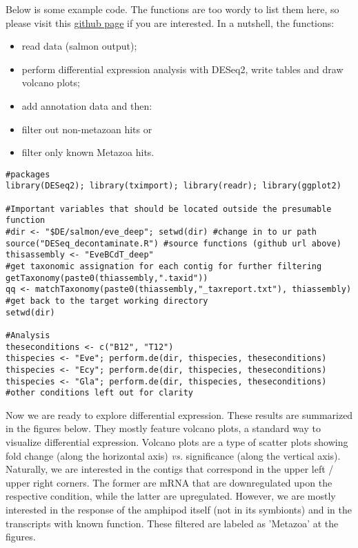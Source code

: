 \documentclass[12pt]{article}
\begin{document}
Below is some example code. 
The functions are too wordy to list them here, so please visit this \href{https://github.com/drozdovapb/code_chunks/blob/master/RNA_seq_DE/DESeq_decontaminate.R}{github page} if you are interested. In a nutshell, the functions: 
\begin{itemize}
\item read data (salmon output);
\item perform differential expression analysis with DESeq2, write tables and draw volcano plots;
\item add annotation data and then: 
\item filter out non-metazoan hits or
\item filter only known Metazoa hits.
\end{itemize}  

\small{
\begin{verbatim}
#packages
library(DESeq2); library(tximport); library(readr); library(ggplot2)

#Important variables that should be located outside the presumable function
#dir <- "$DE/salmon/eve_deep"; setwd(dir) #change in to ur path
source("DESeq_decontaminate.R") #source functions (github url above)
thisassembly <- "EveBCdT_deep"
#get taxonomic assignation for each contig for further filtering
getTaxonomy(paste0(thiassembly,".taxid"))
qq <- matchTaxonomy(paste0(thiassembly,"_taxreport.txt"), thiassembly)
#get back to the target working directory
setwd(dir)

#Analysis
theseconditions <- c("B12", "T12")
thispecies <- "Eve"; perform.de(dir, thispecies, theseconditions)
thispecies <- "Ecy"; perform.de(dir, thispecies, theseconditions)
thispecies <- "Gla"; perform.de(dir, thispecies, theseconditions)
#other conditions left out for clarity
\end{verbatim}
}


Now we are ready to explore differential expression. These results are summarized in the figures below. 
They mostly feature volcano plots, a standard way to visualize differential expression. Volcano plots are a type of scatter plots showing fold change (along the horizontal axis) \textit{vs.} significance (along the vertical axis). Naturally, we are interested in the contigs that correspond in the upper left / upper right corners. The former are mRNA that are downregulated upon the respective condition, while the latter are upregulated. However, we are mostly interested in the response of the amphipod itself (not in its symbionts) and in the transcripts with known function. These filtered are labeled as 'Metazoa' at the figures.
\end{document}
